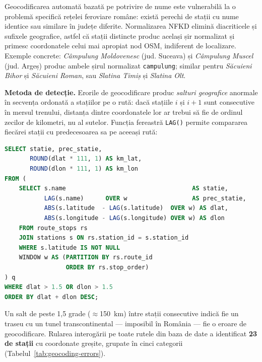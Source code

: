 \documentclass[12pt,a4paper]{report}
\begin{document}
Geocodificarea automată bazată pe potrivire de nume este vulnerabilă la o problemă specifică rețelei feroviare române: există perechi de stații cu nume identice sau similare în județe diferite. Normalizarea NFKD elimină diacriticele și sufixele geografice, astfel că stații distincte produc același șir normalizat și primesc coordonatele celui mai apropiat nod OSM, indiferent de localizare. Exemple concrete: \textit{Câmpulung Moldovenesc} (jud. Suceava) și \textit{Câmpulung Muscel} (jud. Argeș) produc ambele șirul normalizat \texttt{campulung}; similar pentru \textit{Săcuieni Bihor} și \textit{Săcuieni Roman}, sau \textit{Slatina Timiș} și \textit{Slatina Olt}.

\textbf{Metoda de detecție.} Erorile de geocodificare produc \textit{salturi geografice} anormale în secvența ordonată a stațiilor pe o rută: dacă stațiile $i$ și $i+1$ sunt consecutive în mersul trenului, distanța dintre coordonatele lor ar trebui să fie de ordinul zecilor de kilometri, nu al sutelor. Funcția fereastră \texttt{LAG()} permite compararea fiecărei stații cu predecesoarea sa pe aceeași rută:

\begin{lstlisting}[language=SQL, caption=Detectarea salturilor GPS prin functia fereastra LAG()]
SELECT statie, prec_statie,
       ROUND(dlat * 111, 1) AS km_lat,
       ROUND(dlon * 111, 1) AS km_lon
FROM (
    SELECT s.name                                   AS statie,
           LAG(s.name)      OVER w                  AS prec_statie,
           ABS(s.latitude  - LAG(s.latitude)  OVER w) AS dlat,
           ABS(s.longitude - LAG(s.longitude) OVER w) AS dlon
    FROM route_stops rs
    JOIN stations s ON rs.station_id = s.station_id
    WHERE s.latitude IS NOT NULL
    WINDOW w AS (PARTITION BY rs.route_id
                 ORDER BY rs.stop_order)
) q
WHERE dlat > 1.5 OR dlon > 1.5
ORDER BY dlat + dlon DESC;
\end{lstlisting}

Un salt de peste 1,5 grade ($\approx$150~km) între stații consecutive indică fie un traseu cu un tunel transcontinental --- imposibil în România --- fie o eroare de geocodificare. Rularea interogării pe toate rutele din baza de date a identificat \textbf{23 de stații} cu coordonate greșite, grupate în cinci categorii (Tabelul~\ref{tab:geocoding-errors}).
\end{document}
